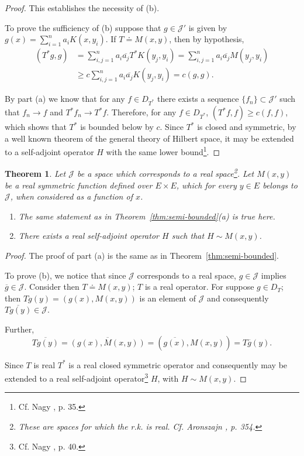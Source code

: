 \documentclass{article}
\newtheorem{theorem}{Theorem}
\begin{document}
\begin{proof}
This establishes the necessity of (b).

To prove the sufficiency of (b) suppose that $g \in \mathcal{J}'$ is given by $g(x) = \sum_{i=1}^n a_i K(x, y_i)$. If $T \doteq M(x, y)$, then by hypothesis,
\begin{align}
(T^*g, g) &= \sum_{i,j=1}^n a_i \overline{a_j} T^*K(y_j, y_i) = \sum_{i,j=1}^n a_i \overline{a_j} M(y_j, y_i) \nonumber \\
&\geq c\sum_{i,j=1}^n a_i \overline{a_j} K(y_j, y_i) = c(g,g).
\label{eq:lower-bound}
\end{align}

By part (a) we know that for any $f \in D_{T^*}$ there exists a sequence $\{f_n\} \subset \mathcal{J}'$ such that $f_n \to f$ and $T^*f_n \to T^*f$. Therefore, for any $f \in D_{T^*}$, $(T^* f, f) \geq c(f, f)$, which shows that $T^*$ is bounded below by $c$. Since $T^*$ is closed and symmetric, by a well known theorem of the general theory of Hilbert space, it may be extended to a self-adjoint operator $H$ with the same lower bound\footnote{Cf. Nagy \cite{nagy}, p. 35.}.
\end{proof}

\begin{theorem}
\label{thm:real-operators}
Let $\mathcal{J}$ be a space which corresponds to a real space\footnote{These are spaces for which the r.k. is real. Cf. Aronszajn \cite{aronszajn2}, p. 354.}. Let $M(x, y)$ be a real symmetric function defined over $E \times E$, which for every $y \in E$ belongs to $\mathcal{J}$, when considered as a function of $x$.
\begin{enumerate}[label=(\alph*)]
\item The same statement as in Theorem~\ref{thm:semi-bounded}(a) is true here.
\item There exists a real self-adjoint operator $H$ such that $H \sim M(x, y)$.
\end{enumerate}
\end{theorem}

\begin{proof}
The proof of part (a) is the same as in Theorem~\ref{thm:semi-bounded}.

To prove (b), we notice that since $\mathcal{J}$ corresponds to a real space, $g \in \mathcal{J}$ implies $\overline{g} \in \mathcal{J}$. Consider then $T \doteq M(x, y)$; $T$ is a real operator. For suppose $g \in D_T$; then $Tg(y) = (g(x), M(x, y))$ is an element of $\mathcal{J}$ and consequently $\overline{Tg(y)} \in \mathcal{J}$.

Further,
\begin{equation}
\overline{Tg(y)} = \overline{(g(x), M(x, y))} = (\overline{g(x)}, M(x, y)) = T\overline{g}(y).
\label{eq:real-operator}
\end{equation}

Since $T$ is real $T^*$ is a real closed symmetric operator and consequently may be extended to a real self-adjoint operator\footnote{Cf. Nagy \cite{nagy}, p. 40.} $H$, with $H \sim M(x, y)$.
\end{proof}
\end{document}
